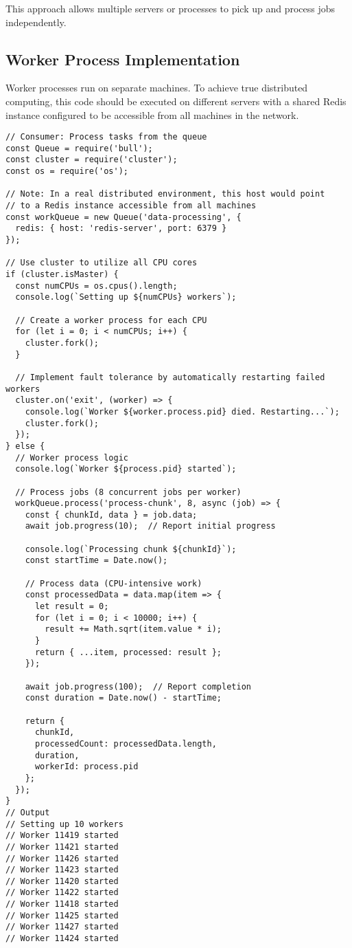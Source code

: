 \documentclass[12pt,letterpaper]{article}
\newenvironment{macterminal}{%
    \begin{mdframed}[
        linecolor=terminalFrame,
        backgroundcolor=terminalBg,
        roundcorner=5pt,
        skipabove=5pt,
        skipbelow=5pt,
        linewidth=1pt,
        innertopmargin=5pt,
        frametitle={%
            \tikz[baseline=(current bounding box.east), outer sep=0pt]{
                \fill[red!80!black] (0,0) circle (5pt);
                \fill[yellow!80!black] (0.7,0) circle (5pt);
                \fill[green!70!black] (1.4,0) circle (5pt);
            }
        },
        frametitlealignment=\raggedright,
        frametitleaboveskip=8pt,
        frametitlebelowskip=0pt,
    ]
}{%
    \end{mdframed}%
}
\begin{document}
This approach allows multiple servers or processes to pick up and process jobs independently.

\subsection{Worker Process Implementation}

Worker processes run on separate machines. To achieve true distributed computing, this code should be executed on different servers with a shared Redis instance configured to be accessible from all machines in the network.

\begin{macterminal}
\begin{lstlisting}
// Consumer: Process tasks from the queue
const Queue = require('bull');
const cluster = require('cluster');
const os = require('os');

// Note: In a real distributed environment, this host would point
// to a Redis instance accessible from all machines
const workQueue = new Queue('data-processing', {
  redis: { host: 'redis-server', port: 6379 }
});

// Use cluster to utilize all CPU cores
if (cluster.isMaster) {
  const numCPUs = os.cpus().length;
  console.log(`Setting up ${numCPUs} workers`);
  
  // Create a worker process for each CPU
  for (let i = 0; i < numCPUs; i++) {
    cluster.fork();
  }
  
  // Implement fault tolerance by automatically restarting failed workers
  cluster.on('exit', (worker) => {
    console.log(`Worker ${worker.process.pid} died. Restarting...`);
    cluster.fork();
  });
} else {
  // Worker process logic
  console.log(`Worker ${process.pid} started`);
  
  // Process jobs (8 concurrent jobs per worker)
  workQueue.process('process-chunk', 8, async (job) => {
    const { chunkId, data } = job.data;
    await job.progress(10);  // Report initial progress
    
    console.log(`Processing chunk ${chunkId}`);
    const startTime = Date.now();
    
    // Process data (CPU-intensive work)
    const processedData = data.map(item => {
      let result = 0;
      for (let i = 0; i < 10000; i++) {
        result += Math.sqrt(item.value * i);
      }
      return { ...item, processed: result };
    });
    
    await job.progress(100);  // Report completion
    const duration = Date.now() - startTime;
    
    return {
      chunkId,
      processedCount: processedData.length,
      duration,
      workerId: process.pid
    };
  });
}
// Output
// Setting up 10 workers
// Worker 11419 started
// Worker 11421 started
// Worker 11426 started
// Worker 11423 started
// Worker 11420 started
// Worker 11422 started
// Worker 11418 started
// Worker 11425 started
// Worker 11427 started
// Worker 11424 started
\end{lstlisting}
\end{macterminal}
\end{document}
